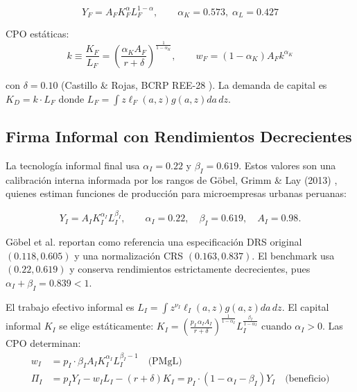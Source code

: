 \documentclass[12pt]{article}
\begin{document}
\begin{equation}\label{eq:formal}
Y_F = A_F K_F^{\alpha} L_F^{1-\alpha}, \qquad \alpha_K = 0.573, \; \alpha_L = 0.427
\end{equation}

CPO estáticas:
\begin{equation}\label{eq:formal_foc}
k \equiv \frac{K_F}{L_F} = \left(\frac{\alpha_K A_F}{r + \delta}\right)^{\frac{1}{1-\alpha_K}}, \qquad
w_F = (1-\alpha_K) A_F k^{\alpha_K}
\end{equation}

con $\delta = 0.10$ (Castillo \& Rojas, BCRP REE-28 \cite{castillo2024}). La demanda de capital es $K_D = k \cdot L_F$ donde $L_F = \int z \ell_F(a,z) g(a,z) da\,dz$.

\subsection{Firma Informal con Rendimientos Decrecientes}

La tecnología informal final usa $\alpha_I=0.22$ y $\beta_I=0.619$. Estos valores son una calibración interna informada por los rangos de Göbel, Grimm \& Lay (2013) \cite{gobel2013}, quienes estiman funciones de producción para microempresas urbanas peruanas:

\begin{equation}\label{eq:informal}
Y_I = A_I K_I^{\alpha_I} L_I^{\beta_I}, \qquad \alpha_I=0.22, \quad \beta_I=0.619, \quad A_I=0.98.
\end{equation}

Göbel et al. reportan como referencia una especificación DRS original $(0.118,0.605)$ y una normalización CRS $(0.163,0.837)$. El benchmark usa $(0.22,0.619)$ y conserva rendimientos estrictamente decrecientes, pues $\alpha_I+\beta_I=0.839<1$.

El trabajo efectivo informal es $L_I = \int z^{\nu_I} \ell_I(a,z) g(a,z) da\,dz$. El capital informal $K_I$ se elige estáticamente: $K_I = \left(\frac{p_I \, \alpha_I A_I}{r+\delta}\right)^{\frac{1}{1-\alpha_I}} L_I^{\frac{\beta_I}{1-\alpha_I}}$ cuando $\alpha_I > 0$. Las CPO determinan:
\begin{align}
w_I &= p_I \cdot \beta_I A_I K_I^{\alpha_I} L_I^{\beta_I-1} \quad \text{(PMgL)} \label{eq:wI}\\
\Pi_I &= p_I Y_I - w_I L_I - (r+\delta)K_I = p_I \cdot (1 - \alpha_I - \beta_I) Y_I \quad \text{(beneficio)} \label{eq:PiI}
\end{align}
\end{document}

